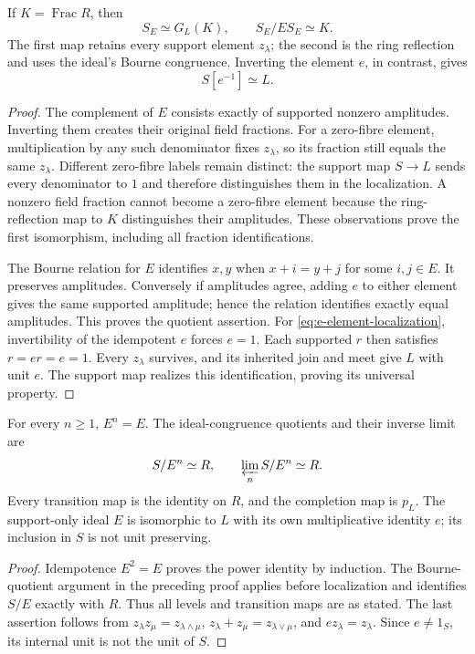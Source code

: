 \begin{theorem}\label{thm:e-stalk}
If $K=\operatorname{Frac}R$, then
\begin{equation}\label{eq:e-localization}
 S_E\simeq G_L(K),\qquad S_E/E S_E\simeq K.
\end{equation}
The first map retains every support element $z_\lambda$; the second is the ring reflection and uses the ideal's Bourne congruence. Inverting the element $e$, in contrast, gives
\begin{equation}\label{eq:e-element-localization}
 S[e^{-1}]\simeq L.
\end{equation}
\end{theorem}
\begin{proof}
The complement of $E$ consists exactly of supported nonzero amplitudes. Inverting them creates their original field fractions. For a zero-fibre element, multiplication by any such denominator fixes $z_\lambda$, so its fraction still equals the same $z_\lambda$. Different zero-fibre labels remain distinct: the support map $S\to L$ sends every denominator to $1$ and therefore distinguishes them in the localization. A nonzero field fraction cannot become a zero-fibre element because the ring-reflection map to $K$ distinguishes their amplitudes. These observations prove the first isomorphism, including all fraction identifications.

The Bourne relation for $E$ identifies $x,y$ when $x+i=y+j$ for some $i,j\in E$. It preserves amplitudes. Conversely if amplitudes agree, adding $e$ to either element gives the same supported amplitude; hence the relation identifies exactly equal amplitudes. This proves the quotient assertion. For \eqref{eq:e-element-localization}, invertibility of the idempotent $e$ forces $e=1$. Each supported $r$ then satisfies $r=er=e=1$. Every $z_\lambda$ survives, and its inherited join and meet give $L$ with unit $e$. The support map realizes this identification, proving its universal property.
\end{proof}

\begin{proposition}\label{prop:e-adic}
For every $n\ge1$, $E^n=E$. The ideal-congruence quotients and their inverse limit are
\begin{equation}\label{eq:e-completion}
 S/E^n\simeq R,\qquad \varprojlim_n S/E^n\simeq R.
\end{equation}
Every transition map is the identity on $R$, and the completion map is $p_L$. The support-only ideal $E$ is isomorphic to $L$ with its own multiplicative identity $e$; its inclusion in $S$ is not unit preserving.
\end{proposition}
\begin{proof}
Idempotence $E^2=E$ proves the power identity by induction. The Bourne-quotient argument in the preceding proof applies before localization and identifies $S/E$ exactly with $R$. Thus all levels and transition maps are as stated. The last assertion follows from $z_\lambda z_\mu=z_{\lambda\wedge\mu}$, $z_\lambda+z_\mu=z_{\lambda\vee\mu}$, and $ez_\lambda=z_\lambda$. Since $e\ne1_S$, its internal unit is not the unit of $S$.
\end{proof}

